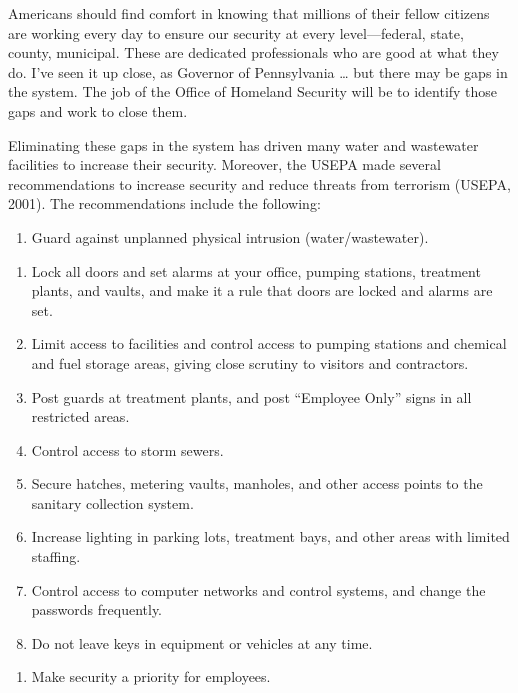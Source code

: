 \documentclass{article}
\begin{document}
Americans should find comfort in knowing that millions of their fellow
citizens are working every day to ensure our security at every
level---federal, state, county, municipal. These are dedicated
professionals who are good at what they do. I've seen it up close, as
Governor of Pennsylvania \ldots{} but there may be gaps in the system.
The job of the Office of Homeland Security will be to identify those
gaps and work to close them.

Eliminating these gaps in the system has driven many water and
wastewater facilities to increase their security. Moreover, the USEPA
made several recommendations to increase security and reduce threats
from terrorism (USEPA, 2001). The recommendations include the following:

\begin{enumerate}
\def\labelenumi{\arabic{enumi}.}
\tightlist
\item
  Guard against unplanned physical intrusion (water/wastewater).
\end{enumerate}

\begin{enumerate}
\def\labelenumi{\alph{enumi}.}
\tightlist
\item
  Lock all doors and set alarms at your office, pumping stations,
  treatment plants, and vaults, and make it a rule that doors are locked
  and alarms are set.
\item
  Limit access to facilities and control access to pumping stations and
  chemical and fuel storage areas, giving close scrutiny to visitors and
  contractors.
\item
  Post guards at treatment plants, and post ``Employee Only'' signs in
  all restricted areas.
\item
  Control access to storm sewers.
\item
  Secure hatches, metering vaults, manholes, and other access points to
  the sanitary collection system.
\item
  Increase lighting in parking lots, treatment bays, and other areas
  with limited staffing.
\item
  Control access to computer networks and control systems, and change
  the passwords frequently.
\item
  Do not leave keys in equipment or vehicles at any time.
\end{enumerate}

\begin{enumerate}
\def\labelenumi{\arabic{enumi}.}
\setcounter{enumi}{1}
\tightlist
\item
  Make security a priority for employees.
\end{enumerate}
\end{document}
